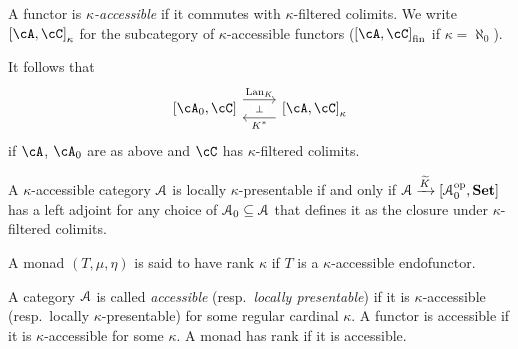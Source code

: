\documentclass[a4paper,11pt,oneside,openany]{scrbook}
\begin{document}
\begin{defn}
	A functor is \emph{$\kappa$-accessible} if it commutes with
    $\kappa$-filtered colimits. We write $\left[\cA,\cC\right]_\kappa$ for the
    subcategory of $\kappa$-accessible functors
    ($\left[\cA,\cC\right]_{\text{fin}}$ if $\kappa=\aleph_0$).
\end{defn}
It follows that
\[
	\begin{tikzcd}
		\left[\cA_0,\cC\right]\ar[r, shift left=1.5ex,"\Lan_K",""{name=A,
        below}]
        & \left[\cA,\cC\right]_\kappa\ar[l, shift left=1.5ex,
        "K^*",""{name=B,above}] \ar[from=A, to=B, "\perp"description]
	\end{tikzcd}
\]
if $\cA$, $\cA_0$ are as above and $\cC$ has $\kappa$-filtered colimits.
\begin{rmk}
	A $\kappa$-accessible category $\operatorname{\mathcal{A}}$ is locally $\kappa$-presentable if and
    only if $\operatorname{\mathcal{A}}\xrightarrow{\widetilde{K}}\left[\operatorname{\mathcal{A}}_0^{\operatorname{\text{op}}},{\normalfont\textbf{Set}}\right]$ has a
    left adjoint for any choice of $\operatorname{\mathcal{A}}_0\subseteq\operatorname{\mathcal{A}}$ that defines it as the
    closure under $\kappa$-filtered colimits.
\end{rmk}
\begin{defn}
	A monad $(T,\mu,\eta)$ is said to have rank $\kappa$ if $T$ is a $\kappa$-accessible endofunctor.
\end{defn}
\begin{defn}
	A category $\operatorname{\mathcal{A}}$ is called \emph{accessible} (resp.\ \emph{locally
    presentable}) if it is $\kappa$-accessible (resp.\ locally
    $\kappa$-presentable) for some regular cardinal $\kappa$. A functor is
    accessible if it is $\kappa$-accessible for some $\kappa$. A monad has rank
    if it is accessible.
\end{defn}
\end{document}
